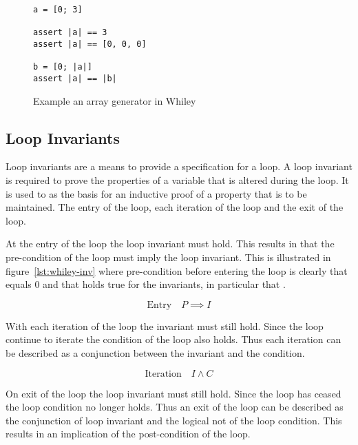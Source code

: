 \begin{figure}[ht]
\begin{lstlisting}
a = [0; 3]

assert |a| == 3
assert |a| == [0, 0, 0]

b = [0; |a|]
assert |a| == |b|
\end{lstlisting}
    \label{lst:whiley-array-gen}
    \caption{Example an array generator in Whiley}
\end{figure}

\cite{whiley-design}
\cite{whiley-arrays}

\subsection{Loop Invariants}

Loop invariants are a means to provide a specification for a loop.
A loop invariant is required to prove the properties of a variable
that is altered during the loop.
It is used to as the basis for an inductive proof of a
property that is to be maintained.
The entry of the loop, each iteration of the loop and the exit of the
loop.

At the entry of the loop the loop invariant must hold.
This results in that the pre-condition of the loop must imply
the loop invariant.
This is illustrated in figure~\ref{lst:whiley-inv} where pre-condition
before entering the loop is clearly that  equals 0 and that holds
true for the invariants, in particular that .

$$\text{Entry} \quad P \implies I$$

With each iteration of the loop the invariant must still hold.
Since the loop continue to iterate the condition of the loop
also holds. Thus each iteration can be described as a conjunction
between the invariant and the condition.

$$\text{Iteration} \quad I \wedge C $$

On exit of the loop the loop invariant must still hold.
Since the loop has ceased the loop condition no longer
holds. Thus an exit of the loop can be described
as the conjunction of loop invariant and the logical
not of the loop condition.
This results in an implication of the post-condition of the
loop.

